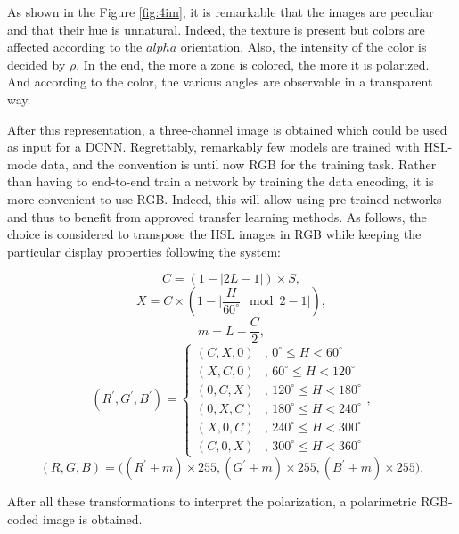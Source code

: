 As shown in the Figure \ref{fig:4im}, it is remarkable that the images are peculiar and that their hue is unnatural. Indeed, the texture is present but colors are affected according to the $alpha$ orientation. Also, the intensity of the color is decided by $\rho$. In the end, the more a zone is colored, the more it is polarized. And according to the color, the various angles are observable in a transparent way.

After this representation, a three-channel image is obtained which could be used as input for a DCNN. 
Regrettably, remarkably few models are trained with HSL-mode data, and the convention is until now RGB for the training task. 
Rather than having to end-to-end train a network by training the data encoding, it is more convenient to use RGB. Indeed, this will allow using pre-trained networks and thus to benefit from approved transfer learning methods.
As follows, the choice is considered to transpose the HSL images in RGB while keeping the particular display properties following the system:

\begin{equation}
	C = (1 - |2L - 1|) \times S,
\end{equation}
\begin{equation}
	X = C \times (1 - \Big| \frac{H}{60^\circ} \mod 2 - 1 \Big| ),
\end{equation}
\begin{equation}
	m = L - \frac{C}{2},
\end{equation}
\begin{equation}
	(R^\prime,G^\prime,B^\prime) = 
	\begin{cases}
		(C,X,0) & \mbox{, }0^\circ \leq H < 60^\circ  \\
		(X,C,0) & \mbox{, }60^\circ \leq H < 120^\circ \\
		(0,C,X) & \mbox{, }120^\circ \leq H < 180^\circ \\
		(0,X,C) & \mbox{, }180^\circ \leq H < 240^\circ \\
		(X,0,C) & \mbox{, }240^\circ \leq H < 300^\circ \\
		(C,0,X) & \mbox{, }300^\circ \leq H < 360^\circ  
    \end{cases},
\end{equation}
\begin{equation}
	(R,G,B) = \Big( (R^\prime+m)\times 255, (G^\prime+m)\times 255,(B^\prime+m)\times 255 \Big).
\end{equation}

After all these transformations to interpret the polarization, a polarimetric RGB-coded image is obtained.


